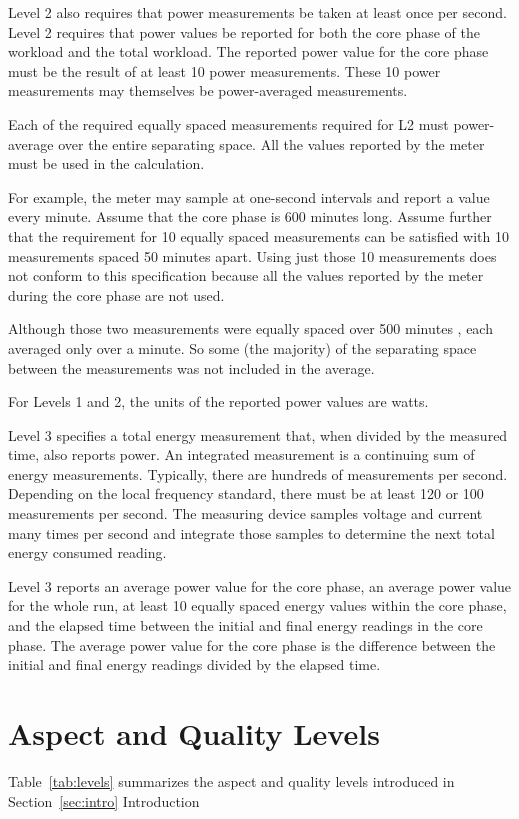 \noindent
Level 2 also requires that power measurements be taken at least once per second. Level 2 requires that power values be reported for both the core phase of the workload and the total workload. The reported power value for the core phase must be the result of at least 10 power measurements. These 10 power measurements may themselves be power-averaged measurements.
\wl

\noindent
Each of the required equally spaced measurements required for L2 must power-average over the entire separating space.  All the values reported by the meter must be used in the calculation.
\wl

\noindent
For example, the meter may sample at one-second intervals and report a value every minute. Assume that the core phase is 600 minutes long. Assume further that the requirement for 10 equally spaced measurements can be satisfied with 10 measurements spaced 50 minutes apart. Using just those 10 measurements does not conform to this specification because all the values reported by the meter during the core phase are not used. 
\wl

\noindent
Although those two measurements were equally spaced over 500 minutes , each averaged only over a minute. So some (the majority) of the separating space between the measurements was not included in the average. 
\wl

\noindent
For Levels 1 and 2, the units of the reported power values are watts.
\wl

\noindent
Level 3 specifies a total energy measurement that, when divided by the measured time, also reports power. An integrated measurement is a continuing sum of energy measurements. Typically, there are hundreds of measurements per second.  Depending on the local frequency standard, there must be at least 120 or 100 measurements per second. The measuring device samples voltage and current many times per second and integrate those samples to determine the next total energy consumed reading. 
\wl

\noindent
Level 3 reports an average power value for the core phase, an average power value for the whole run, at least 10 equally spaced energy values within the core phase, and the elapsed time between the initial and final energy readings in the core phase. The average power value for the core phase is the difference between the initial and final energy readings divided by the elapsed time.

\section{Aspect and Quality Levels}
\label{sec:AQLevels}
\noindent
Table~\ref{tab:levels} summarizes the aspect and quality levels introduced in Section~\ref{sec:intro} Introduction

